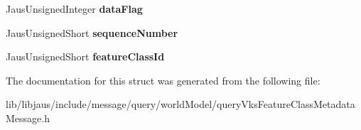 \begin{DoxyCompactItemize}
\item 
\hypertarget{struct_query_vks_feature_class_metadata_message_struct_af8d9ad7f99ebf861cd3fa6d20e263c0e}{\-Jaus\-Unsigned\-Integer {\bfseries data\-Flag}}\label{struct_query_vks_feature_class_metadata_message_struct_af8d9ad7f99ebf861cd3fa6d20e263c0e}

\item 
\hypertarget{struct_query_vks_feature_class_metadata_message_struct_a2615547df5216b18f60fd90508700c03}{\-Jaus\-Unsigned\-Short {\bfseries sequence\-Number}}\label{struct_query_vks_feature_class_metadata_message_struct_a2615547df5216b18f60fd90508700c03}

\item 
\hypertarget{struct_query_vks_feature_class_metadata_message_struct_afc359172d8feb8cbba89d14a23149921}{\-Jaus\-Unsigned\-Short {\bfseries feature\-Class\-Id}}\label{struct_query_vks_feature_class_metadata_message_struct_afc359172d8feb8cbba89d14a23149921}

\end{DoxyCompactItemize}


\-The documentation for this struct was generated from the following file\-:\begin{DoxyCompactItemize}
\item 
lib/libjaus/include/message/query/world\-Model/query\-Vks\-Feature\-Class\-Metadata\-Message.\-h\end{DoxyCompactItemize}
